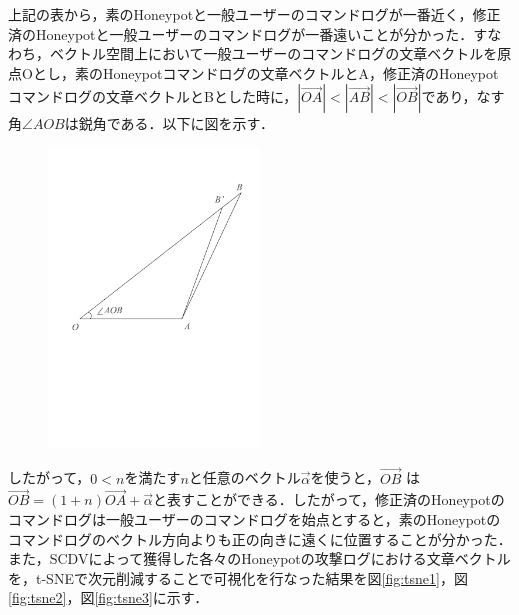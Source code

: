 上記の表から，素のHoneypotと一般ユーザーのコマンドログが一番近く，修正済のHoneypotと一般ユーザーのコマンドログが一番遠いことが分かった．すなわち，ベクトル空間上において一般ユーザーのコマンドログの文章ベクトルを原点Oとし，素のHoneypotコマンドログの文章ベクトルとA，修正済のHoneypotコマンドログの文章ベクトルとBとした時に，$ |\vec{OA}| < |\vec{AB}| < |\vec{OB}| $であり，なす角$ \angle AOB $は鋭角である．以下に図を示す．\\

\clearpage

\begin{figure}[htbp]
    \centering
    \includegraphics[width=0.5\textwidth]{figures/sankaku.pdf}
\end{figure}

したがって，$ 0 < n $を満たす$ n $と任意のベクトル$ \vec{\alpha} $を使うと，$ \vec{OB} $ は $ \vec{OB} = (1+n)\vec{OA} + \vec{\alpha} $と表すことができる．したがって，修正済のHoneypotのコマンドログは一般ユーザーのコマンドログを始点とすると，素のHoneypotのコマンドログのベクトル方向よりも正の向きに遠くに位置することが分かった．\\
また，SCDVによって獲得した各々のHoneypotの攻撃ログにおける文章ベクトルを，t-SNEで次元削減することで可視化を行なった結果を図\ref{fig:tsne1}，図\ref{fig:tsne2}，図\ref{fig:tsne3}に示す．

